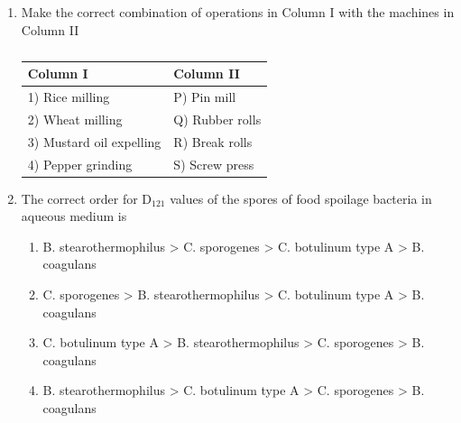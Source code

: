 \documentclass[a4paper,10pt]{article}
\begin{document}
\begin{enumerate}
    \hfill{}
    
    \item Make the correct combination of operations in Column I with the machines in Column II
    \begin{table}[h!] \centering \caption*{} \label{tab:q11_food}
        \begin{tabular}{ll} \hline
            \textbf{Column I} & \textbf{Column II} \\ \hline
            1) Rice milling & P) Pin mill \\
            2) Wheat milling & Q) Rubber rolls \\
            3) Mustard oil expelling & R) Break rolls \\
            4) Pepper grinding & S) Screw press \\ \hline
        \end{tabular}
    \end{table}
    
    \hfill{}
    \begin{enumerate}[label=\Alph*)]
    \end{enumerate}

    \item The correct order for D$_{121}$ values of the spores of food spoilage bacteria in aqueous medium is
    
    \hfill{}
    \begin{enumerate}[label=\Alph*)]
        \item B. stearothermophilus > C. sporogenes > C. botulinum type A > B. coagulans
        \item C. sporogenes > B. stearothermophilus > C. botulinum type A > B. coagulans
        \item C. botulinum type A > B. stearothermophilus > C. sporogenes > B. coagulans
        \item B. stearothermophilus > C. botulinum type A > C. sporogenes > B. coagulans
    \end{enumerate}
    

\end{enumerate}
\end{document}
